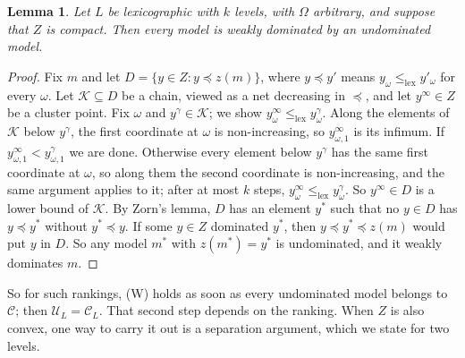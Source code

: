 \documentclass[11pt]{article}
\newtheorem{lemma}[theorem]{Lemma}
\theoremstyle{definition}
\theoremstyle{remark}
\newcommand{\C}{\mathcal C}
\newcommand{\U}{\mathcal U}
\begin{document}
\begin{lemma}\label{lem:zorn}
Let $L$ be lexicographic with $k$ levels, with $\Omega$ arbitrary, and suppose that $Z$ is compact. Then every model is weakly dominated by an undominated model.
\end{lemma}
\begin{proof}
Fix $m$ and let $D=\{y\in Z:y\preceq z(m)\}$, where $y\preceq y'$ means $y_\omega\le_{\mathrm{lex}}y'_\omega$ for every $\omega$. Let $\mathcal K\subseteq D$ be a chain, viewed as a net decreasing in $\preceq$, and let $y^\infty\in Z$ be a cluster point. Fix $\omega$ and $y^\gamma\in\mathcal K$; we show $y^\infty_\omega\le_{\mathrm{lex}}y^\gamma_\omega$. Along the elements of $\mathcal K$ below $y^\gamma$, the first coordinate at $\omega$ is non-increasing, so $y^\infty_{\omega,1}$ is its infimum. If $y^\infty_{\omega,1}<y^\gamma_{\omega,1}$ we are done. Otherwise every element below $y^\gamma$ has the same first coordinate at $\omega$, so along them the second coordinate is non-increasing, and the same argument applies to it; after at most $k$ steps, $y^\infty_\omega\le_{\mathrm{lex}}y^\gamma_\omega$. So $y^\infty\in D$ is a lower bound of $\mathcal K$. By Zorn's lemma, $D$ has an element $y^*$ such that no $y\in D$ has $y\preceq y^*$ without $y^*\preceq y$. If some $y\in Z$ dominated $y^*$, then $y\preceq y^*\preceq z(m)$ would put $y$ in $D$. So any model $m^*$ with $z(m^*)=y^*$ is undominated, and it weakly dominates $m$.
\end{proof}
So for such rankings, (W) holds as soon as every undominated model belongs to $\C$; then $\U_L=\C_L$. That second step depends on the ranking. When $Z$ is also convex, one way to carry it out is a separation argument, which we state for two levels.
\end{document}

